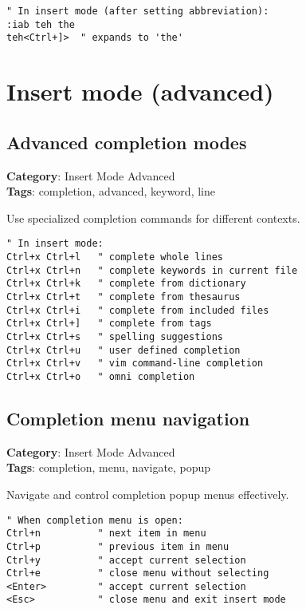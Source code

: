 {{{{{\begin{Exa*}{}
\begin{Verbatim}[fontsize=\footnotesize, breaklines, breakanywhere]
" In insert mode (after setting abbreviation):
:iab teh the
teh<Ctrl+]>  " expands to 'the'
\end{Verbatim}
\end{Exa*}

\chapter{Insert mode (advanced)}
\section{Advanced completion modes}

\textbf{Category}: Insert Mode Advanced\\ \textbf{Tags}: completion, advanced, keyword, line
\vspace{0.5cm}

Use specialized completion commands for different contexts.

\begin{Exa*}{}
\begin{Verbatim}[fontsize=\footnotesize, breaklines, breakanywhere]
" In insert mode:
Ctrl+x Ctrl+l   " complete whole lines
Ctrl+x Ctrl+n   " complete keywords in current file
Ctrl+x Ctrl+k   " complete from dictionary
Ctrl+x Ctrl+t   " complete from thesaurus
Ctrl+x Ctrl+i   " complete from included files
Ctrl+x Ctrl+]   " complete from tags
Ctrl+x Ctrl+s   " spelling suggestions
Ctrl+x Ctrl+u   " user defined completion
Ctrl+x Ctrl+v   " vim command-line completion
Ctrl+x Ctrl+o   " omni completion
\end{Verbatim}
\end{Exa*}

\section{Completion menu navigation}

\textbf{Category}: Insert Mode Advanced\\ \textbf{Tags}: completion, menu, navigate, popup
\vspace{0.5cm}

Navigate and control completion popup menus effectively.

\begin{Exa*}{}
\begin{Verbatim}[fontsize=\footnotesize, breaklines, breakanywhere]
" When completion menu is open:
Ctrl+n          " next item in menu
Ctrl+p          " previous item in menu
Ctrl+y          " accept current selection
Ctrl+e          " close menu without selecting
<Enter>         " accept current selection
<Esc>           " close menu and exit insert mode
\end{Verbatim}
\end{Exa*}

}}}}}

